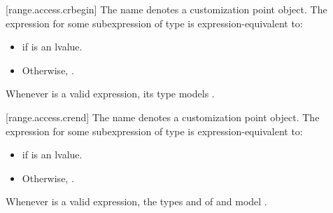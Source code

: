 [range.access.crbegin]{}
\pnum
The name  denotes a customization point
object. The expression
 for some subexpression  of type
 is expression-equivalent to:
\begin{itemize}
\item {} if  is
  an lvalue.
\item Otherwise, .
\end{itemize}

\pnum
\begin{note}
Whenever  is a valid expression, its
type models .
\end{note}

[range.access.crend]{}
\pnum
The name  denotes a customization point
object. The expression
 for some subexpression  of type 
is expression-equivalent to:
\begin{itemize}
\item {} if  is an lvalue.

\item Otherwise, .
\end{itemize}

\pnum
\begin{note}
Whenever  is a valid expression,
the types  and  of
 and 
model .
\end{note}

